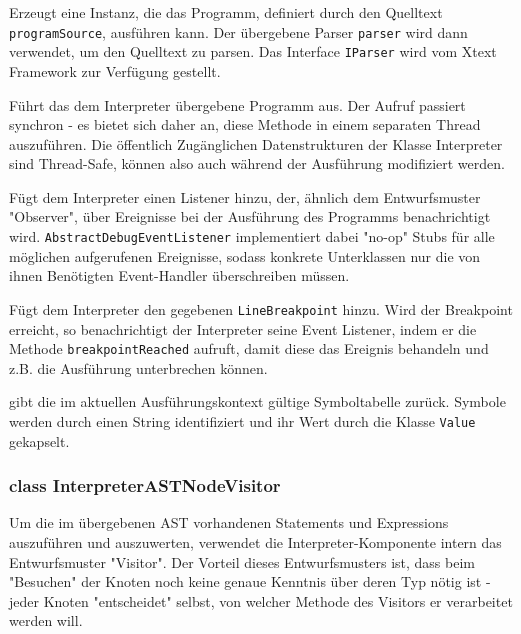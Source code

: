 \begin{description}
    Erzeugt eine Instanz, die das Programm, definiert durch den Quelltext \texttt{programSource}, ausführen kann. Der übergebene Parser \texttt{parser} wird dann verwendet, um den Quelltext zu parsen. Das Interface \texttt{IParser} wird vom Xtext Framework zur Verfügung gestellt.

    Führt das dem Interpreter übergebene Programm aus. Der Aufruf passiert synchron - es bietet sich daher an, diese Methode in einem separaten Thread auszuführen. Die öffentlich Zugänglichen Datenstrukturen der Klasse Interpreter sind Thread-Safe, können also auch während der Ausführung modifiziert werden.

    Fügt dem Interpreter einen Listener hinzu, der, ähnlich dem Entwurfsmuster "Observer", über Ereignisse bei der Ausführung des Programms benachrichtigt wird. \texttt{AbstractDebugEventListener} implementiert dabei "no-op" Stubs für alle möglichen aufgerufenen Ereignisse, sodass konkrete Unterklassen nur die von ihnen Benötigten Event-Handler überschreiben müssen.


    Fügt dem Interpreter den gegebenen \texttt{LineBreakpoint} hinzu. Wird der Breakpoint erreicht, so benachrichtigt der Interpreter seine Event Listener, indem er die Methode \texttt{breakpointReached} aufruft, damit diese das Ereignis behandeln und z.B. die Ausführung unterbrechen können.

     gibt die im aktuellen Ausführungskontext gültige Symboltabelle zurück. Symbole werden durch einen String identifiziert und ihr Wert durch die Klasse \texttt{Value} gekapselt.
\end{description}

\subsubsection{class InterpreterASTNodeVisitor}
Um die im übergebenen AST vorhandenen Statements und Expressions auszuführen und auszuwerten, verwendet die Interpreter-Komponente intern das Entwurfsmuster "Visitor". Der Vorteil dieses Entwurfsmusters ist, dass beim "Besuchen" der Knoten noch keine genaue Kenntnis über deren Typ nötig ist - jeder Knoten "entscheidet" selbst, von welcher Methode des Visitors er verarbeitet werden will.

